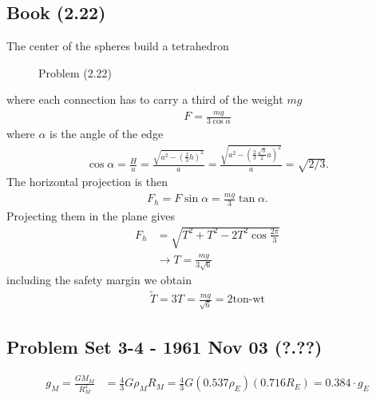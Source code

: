 \documentclass[10pt,a4paper]{book}
\theoremstyle{definition}
\begin{document}
\subsection{Book (2.22)}
The center of the spheres build a tetrahedron
\begin{figure}[!h]
\centering
{}
\caption{Problem (2.22)}
\end{figure}
where each connection has to carry a third of the weight $mg$
\begin{align}
F=\frac{mg}{3\cos\alpha}
\end{align}
where $\alpha$ is the angle of the edge
\begin{align}
\cos\alpha=\frac{H}{a}=\frac{\sqrt{a^2-\left(\frac{2}{3}h\right)^2}}{a}=\frac{\sqrt{a^2-\left(\frac{2}{3}\frac{\sqrt{3}}{2}a\right)^2}}{a}=\sqrt{2/3}.
\end{align}
The horizontal projection is then
\begin{align}
F_h=F\sin\alpha=\frac{mg}{3}\tan\alpha.
\end{align}
Projecting them in the plane gives
\begin{align}
F_h&=\sqrt{T^2+T^2-2T^2\cos\frac{2\pi}{3}}\\
&\rightarrow T=\frac{mg}{3\sqrt{6}}
\end{align}
including the safety margin we obtain
\begin{align}
\widetilde{T}=3T=\frac{mg}{\sqrt{6}}=2\text{ton-wt}
\end{align}


\subsection{Problem Set 3-4 - 1961 Nov 03 (?.??)}
\begin{align}
    g_M=\frac{GM_M}{R_M^2}&=\frac{4}{3}G\rho_M R_M=\frac{4}{3}G (0.537\rho_E) (0.716R_E)=0.384 \cdot g_E
\end{align}
\end{document}

